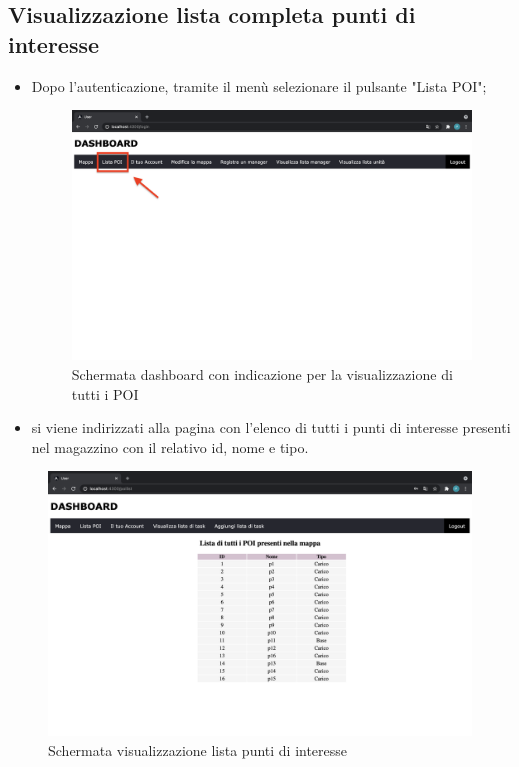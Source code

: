 \subsection{Visualizzazione lista completa punti di interesse}
\begin{itemize}
    \item Dopo l'autenticazione, tramite il menù selezionare il pulsante "Lista POI";
    \begin{figure}[H]
        \centering
        \includegraphics[scale=0.12]{res/images/dashboard2.png}
        \caption{Schermata dashboard con indicazione per la visualizzazione di tutti i POI}
    \end{figure}
    \item si viene indirizzati alla pagina con l'elenco di tutti i punti di interesse presenti nel magazzino con il relativo id, nome e tipo.

\end{itemize}

\begin{figure}[H]
    \centering
    \includegraphics[scale=0.12]{res/images/listpoi_user.png}
    \caption{Schermata visualizzazione lista punti di interesse}
\end{figure}

